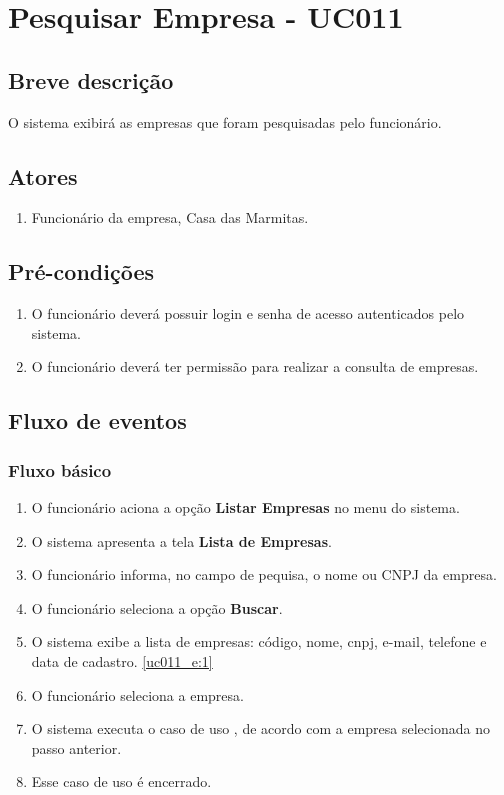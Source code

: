 \chapter{Pesquisar Empresa - UC011} \label{uc011}

\section{Breve descrição}

O sistema exibirá as empresas que foram pesquisadas pelo funcionário.

\section{Atores}

\begin{enumerate}
	\item Funcionário da empresa, Casa das Marmitas.
\end{enumerate}

\section{Pré-condições}

\begin{enumerate}
	\item O funcionário deverá possuir login e senha de acesso autenticados pelo sistema.
	\item O funcionário deverá ter permissão para realizar a consulta de empresas.
\end{enumerate}

\section{Fluxo de eventos}

\subsection{Fluxo básico}

\begin{enumerate}[label=P\arabic*]
	\item O funcionário aciona a opção \textbf{Listar Empresas} no menu do sistema.
	\item O sistema apresenta a tela \textbf{Lista de Empresas}. \label{uc011_p:2}	
	\item O funcionário informa, no campo de pequisa, o nome ou CNPJ da empresa.
	\item O funcionário seleciona a opção \textbf{Buscar}.
	\item O sistema exibe a lista de empresas: código, nome, cnpj, e-mail, telefone e data de cadastro. \label{uc011_p:5}\ref{uc011_e:1}
	\item O funcionário seleciona a empresa.
	\item O sistema executa o caso de uso , de acordo com a empresa selecionada no passo anterior.
	\item Esse caso de uso é encerrado.
\end{enumerate}

